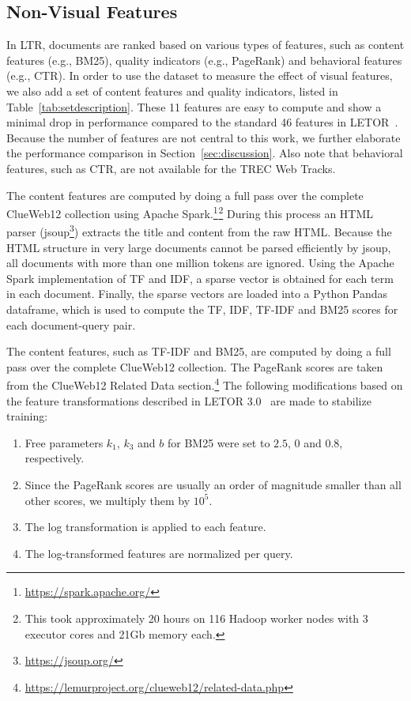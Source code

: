 \subsection{Non-Visual Features} 
\label{sec:contentfeature}
In LTR, documents are ranked based on various types of features, such as content features (e.g., BM25), quality indicators (e.g., PageRank) and behavioral features (e.g., CTR).
In order to use the \datasetname{} dataset to measure the effect of visual features, we also add a set of content features and quality indicators,
listed in Table~\ref{tab:setdescription}.
These 11 features are easy to compute and show a minimal drop in performance compared to the standard 46 features in LETOR~\cite{qin2010letor}.
Because the number of features are not central to this work, we further elaborate the performance comparison in Section~\ref{sec:discussion}.
Also note that behavioral features, such as CTR, are not available for the TREC Web Tracks.

The content features are computed by doing a full pass over the complete ClueWeb12 collection using Apache Spark.\footnote{\url{https://spark.apache.org/}}$^{ }$\footnote{This took approximately 20 hours on 116 Hadoop worker nodes with 3 executor cores and 21Gb memory each.}
During this process an HTML parser (jsoup\footnote{\url{https://jsoup.org/}}) extracts the title and content from the raw HTML.
Because the HTML structure in very large documents cannot be parsed efficiently by jsoup, all documents with more than one million tokens are ignored.
Using the Apache Spark implementation of TF and IDF, a sparse vector is obtained for each term in each document. Finally, the sparse vectors are loaded into a Python Pandas dataframe, which is used to compute the TF, IDF, TF-IDF and BM25 scores for each document-query pair.
\fi

The content features, such as TF-IDF and BM25, are computed by doing a full pass over the complete ClueWeb12 collection.
The PageRank scores are taken from the ClueWeb12 Related Data section.\footnote{\url{https://lemurproject.org/clueweb12/related-data.php}}
The following modifications based on the feature transformations described in LETOR 3.0~\cite{qin2010letor} are made to stabilize training:
\begin{enumerate}[leftmargin=14pt]
\item Free parameters $k_1$, $k_3$ and $b$ for BM25 were set to $2.5$, $0$ and $0.8$, respectively. 
\item Since the PageRank scores are usually an order of magnitude smaller than all other scores, we multiply them by $10^5$.
\item The log transformation is applied to each feature.
\item The log-transformed features are normalized per query.  
\end{enumerate}

